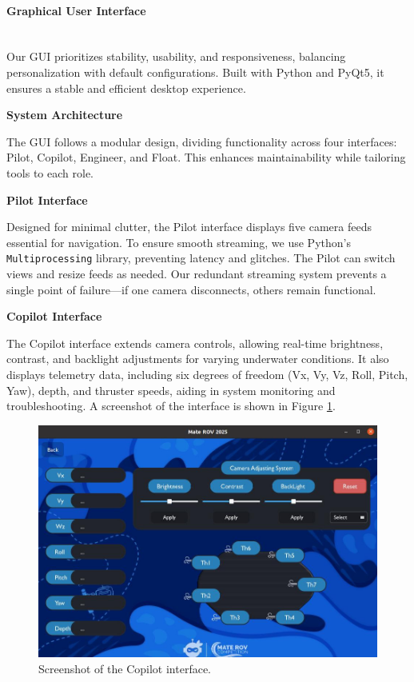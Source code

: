 \vspace{-0.3cm}
\paragraph{Graphical User Interface} \ \\
Our GUI prioritizes stability, usability, and responsiveness, balancing personalization with default configurations. Built with Python and PyQt5, it ensures a stable and efficient desktop experience.

\vspace{0.2cm}
\textbf{System Architecture}

The GUI follows a modular design, dividing functionality across four interfaces: Pilot, Copilot, Engineer, and Float. This enhances maintainability while tailoring tools to each role.

\vspace{0.2cm}
\textbf{Pilot Interface}

Designed for minimal clutter, the Pilot interface displays five camera feeds essential for navigation. To ensure smooth streaming, we use Python's \texttt{Multiprocessing} library, preventing latency and glitches. The Pilot can switch views and resize feeds as needed. Our redundant streaming system prevents a single point of failure—if one camera disconnects, others remain functional. 

\vspace{0.2cm}
\textbf{Copilot Interface}

The Copilot interface extends camera controls, allowing real-time brightness, contrast, and backlight adjustments for varying underwater conditions. It also displays telemetry data, including six degrees of freedom (Vx, Vy, Vz, Roll, Pitch, Yaw), depth, and thruster speeds, aiding in system monitoring and troubleshooting. A screenshot of the interface is shown in Figure \ref{fig:copilot_interface}.

\begin{figure}[ht]
    \centering
    \includegraphics[width=0.8\columnwidth]{Sections/2Design Rationale/images/Copilot_interface.jpeg}
    \caption{Screenshot of the Copilot interface.}
    \label{fig:copilot_interface}
\end{figure}

